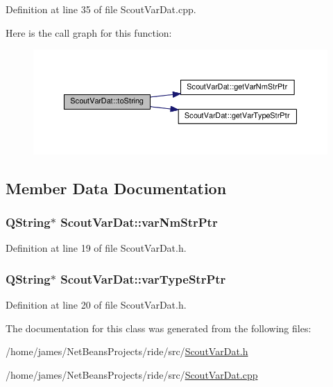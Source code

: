 Definition at line 35 of file Scout\-Var\-Dat.\-cpp.



Here is the call graph for this function\-:
\nopagebreak
\begin{figure}[H]
\begin{center}
\leavevmode
\includegraphics[width=350pt]{class_scout_var_dat_afbda8247aaa558f3a1e63a667dde8acc_cgraph}
\end{center}
\end{figure}




\subsection{Member Data Documentation}
\hypertarget{class_scout_var_dat_a0ad65ef63afac8cdc452adf691cc1b23}{
\subsubsection[{var\-Nm\-Str\-Ptr}]{\setlength{\rightskip}{0pt plus 5cm}Q\-String$\ast$ Scout\-Var\-Dat\-::var\-Nm\-Str\-Ptr\hspace{0.3cm}{\ttfamily [private]}}}\label{class_scout_var_dat_a0ad65ef63afac8cdc452adf691cc1b23}


Definition at line 19 of file Scout\-Var\-Dat.\-h.

\hypertarget{class_scout_var_dat_a83360e9bfcdd440aecbd4c8e99c3ab08}{
\subsubsection[{var\-Type\-Str\-Ptr}]{\setlength{\rightskip}{0pt plus 5cm}Q\-String$\ast$ Scout\-Var\-Dat\-::var\-Type\-Str\-Ptr\hspace{0.3cm}{\ttfamily [private]}}}\label{class_scout_var_dat_a83360e9bfcdd440aecbd4c8e99c3ab08}


Definition at line 20 of file Scout\-Var\-Dat.\-h.



The documentation for this class was generated from the following files\-:\begin{DoxyCompactItemize}
\item 
/home/james/\-Net\-Beans\-Projects/ride/src/\hyperlink{_scout_var_dat_8h}{Scout\-Var\-Dat.\-h}\item 
/home/james/\-Net\-Beans\-Projects/ride/src/\hyperlink{_scout_var_dat_8cpp}{Scout\-Var\-Dat.\-cpp}\end{DoxyCompactItemize}
